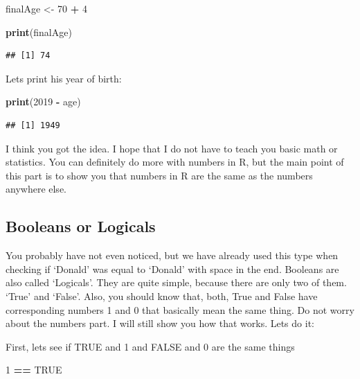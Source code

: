 \documentclass[]{book}
\newenvironment{Shaded}{\begin{snugshade}}{\end{snugshade}}
\newcommand{\DecValTok}[1]{\textcolor[rgb]{0.00,0.00,0.81}{#1}}
\newcommand{\KeywordTok}[1]{\textcolor[rgb]{0.13,0.29,0.53}{\textbf{#1}}}
\newcommand{\NormalTok}[1]{#1}
\newcommand{\OperatorTok}[1]{\textcolor[rgb]{0.81,0.36,0.00}{\textbf{#1}}}
\newcommand{\OtherTok}[1]{\textcolor[rgb]{0.56,0.35,0.01}{#1}}
\newcommand{\StringTok}[1]{\textcolor[rgb]{0.31,0.60,0.02}{#1}}
\begin{document}
\begin{Shaded}
\begin{Highlighting}[]
\NormalTok{finalAge <-}\StringTok{ }\DecValTok{70} \OperatorTok{+}\StringTok{ }\DecValTok{4}

\KeywordTok{print}\NormalTok{(finalAge)}
\end{Highlighting}
\end{Shaded}

\begin{verbatim}
## [1] 74
\end{verbatim}

Lets print his year of birth:

\begin{Shaded}
\begin{Highlighting}[]
\KeywordTok{print}\NormalTok{(}\DecValTok{2019} \OperatorTok{-}\StringTok{ }\NormalTok{age)}
\end{Highlighting}
\end{Shaded}

\begin{verbatim}
## [1] 1949
\end{verbatim}

I think you got the idea. I hope that I do not have to teach you basic math or statistics. You can definitely do more with numbers in R, but the main point of this part is to show you that numbers in R are the same as the numbers anywhere else.

\hypertarget{booleans-or-logicals}{%
\subsection{Booleans or Logicals}\label{booleans-or-logicals}}

You probably have not even noticed, but we have already used this type when checking if `Donald' was equal to `Donald' with space in the end. Booleans are also called `Logicals'. They are quite simple, because there are only two of them. `True' and `False'. Also, you should know that, both, True and False have corresponding numbers 1 and 0 that basically mean the same thing. Do not worry about the numbers part. I will still show you how that works. Lets do it:

First, lets see if TRUE and 1 and FALSE and 0 are the same things

\begin{Shaded}
\begin{Highlighting}[]
\DecValTok{1} \OperatorTok{==}\StringTok{ }\OtherTok{TRUE}
\end{Highlighting}
\end{Shaded}
\end{document}
